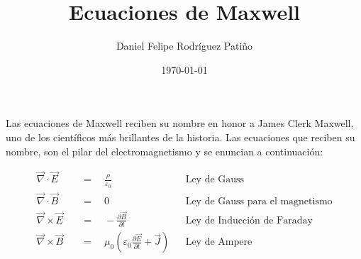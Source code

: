 \documentclass{article}
\title{Ecuaciones de Maxwell}
\author{Daniel Felipe Rodríguez Patiño}
\date{\today}
\begin{document}
    \maketitle
    Las ecuaciones de Maxwell reciben su nombre en
    honor a James Clerk Maxwell, uno de los científicos
    más brillantes de la historia. Las ecuaciones que
    reciben su nombre, son el pilar del electromagnetismo
    y se enuncian a continuación:

    \begin{align}
        \vec{\nabla} \cdot \vec{E} \quad &= \quad \frac{\rho}{\varepsilon_0} && \textrm{Ley de Gauss} \\
        \vec{\nabla} \cdot \vec{B} \quad &= \quad 0 && \textrm{Ley de Gauss para el magnetismo} \\
        \vec{\nabla} \times \vec{E} \quad &= \quad -\frac{\partial\vec{B}}{\partial t} && \textrm{Ley de Inducción de Faraday} \\
        \vec{\nabla} \times \vec{B} \quad &= \quad \mu_0 \left(\varepsilon_0 \frac{\partial\vec{E}}{\partial t} + \vec{J} \right) && \textrm{Ley de Ampere}
    \end{align}
\end{document}
